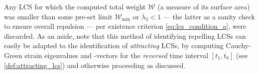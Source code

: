 Any LCS for which the computed total weight $\mathcal{W}$ (a measure of
its surface area) was smaller than some pre-set limit $\mathcal{W}_{\min}$ or
$\overline{\lambda}_{3} < 1$ --- the latter as a sanity
check to ensure overall repulsion --- per existence criterion
\eqref{eq:lcs_condition_a}, were discarded. As an aside, note that this method
of identifying repelling LCSs can easily be adapted to the identification of
\emph{attracting} LCSs, by computing Cauchy-Green strain eigenvalues and
-vectors for the \emph{reversed} time interval $[t_{1},t_{0}]$ (see
\cref{def:attracting_lcs}) and otherwise proceeding as discussed.




